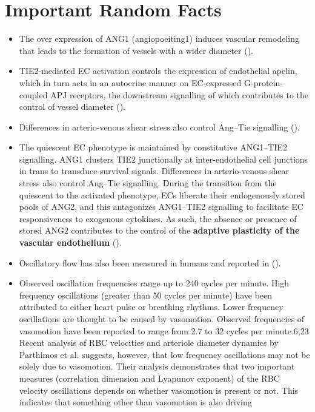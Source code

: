 \section{Important Random Facts}
\begin{itemize}
	\item The over expression of ANG1 (angiopoeiting1) induces vascular remodeling that leads to the formation of vessels with a wider diameter (\cite{Augustin2009}).
	\item  TIE2-mediated EC activation controls the expression of endothelial apelin, which in turn acts in an autocrine manner on EC-expressed G-protein-coupled APJ receptors, the downstream signalling of which contributes to the control of vessel diameter (\cite{Augustin2009,Kidoya2008}).
	\item  Differences in arterio-venous shear stress also control Ang–Tie signalling (\cite{Augustin2009}).
	\item The quiescent EC phenotype is maintained by constitutive ANG1–TIE2 signalling. ANG1 clusters TIE2 junctionally at inter-endothelial cell junctions in trans to transduce survival signals. Differences in arterio-venous shear stress also control Ang–Tie signalling. During the transition from the quiescent to the activated phenotype, ECs liberate their endogenously stored pools of ANG2, and this antagonizes ANG1–TIE2 signalling to facilitate EC responsiveness to exogenous cytokines. As such, the absence or presence of stored ANG2 contributes to the control of the \textbf{adaptive plasticity of the vascular endothelium} (\cite{Augustin2009}).
	\item  Oscillatory flow has also been measured in humans and reported in \cite{Rodgers1984} (\cite{Carr2005}).
	\item Observed oscillation frequencies range up to 240 cycles per minute. High frequency oscillations (greater than 50 cycles per minute) have been attributed to either heart pulse or breathing rhythms. Lower frequency oscillations are thought to be caused by vasomotion. Observed frequencies of vasomotion have been reported to range from 2.7 to 32 cycles per minute.6,23 Recent analysis of RBC velocities and arteriole diameter dynamics by Parthimos et al. suggests, however, that low frequency oscillations may not be solely due to vasomotion. Their analysis demonstrates that two important measures (correlation dimension
	and Lyapunov exponent) of the RBC velocity oscillations
	depends on whether vasomotion is present or not. This indicates that something other than vasomotion is also driving

\end{itemize}
